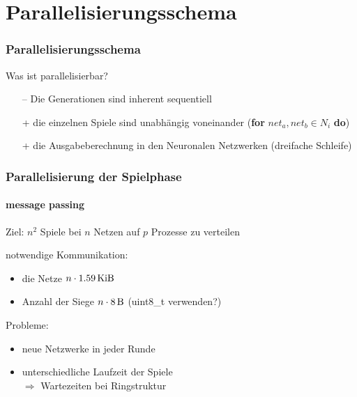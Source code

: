 \section{Parallelisierungsschema}

\begin{frame}
    \frametitle{Parallelisierungsschema}

    Was ist parallelisierbar?
    \begin{itemize}
        \item[--]
            Die Generationen sind inherent sequentiell
        \item[+]
            die einzelnen Spiele sind unabhängig voneinander
            (\textbf{for} $net_a, net_b \in N_i$ \textbf{do})
        \item[+]
            die Ausgabeberechnung in den Neuronalen Netzwerken
            (dreifache Schleife)
    \end{itemize}
\end{frame}

\begin{frame}
    \frametitle{Parallelisierung der Spielphase}
    \framesubtitle{message passing}

    Ziel: $n^2$ Spiele bei $n$ Netzen auf $p$ Prozesse zu verteilen

    notwendige Kommunikation:
    \begin{itemize}
        \item die Netze $n \cdot \SI{1.59}{\kibi\byte}$
        \item Anzahl der Siege $n \cdot \SI{8}{\byte}$ (uint8\_t verwenden?)
    \end{itemize}
    Probleme:
    \begin{itemize}
        \item neue Netzwerke in jeder Runde
        \item unterschiedliche Laufzeit der Spiele \\
            $\Rightarrow$ Wartezeiten bei Ringstruktur
    \end{itemize}
\end{frame}

